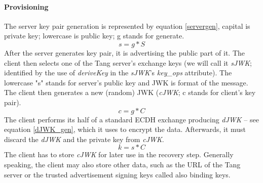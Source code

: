 \paragraph{Provisioning}
The server key pair generation is represented by equation \ref{servergen}, capital is private key; lowercase is public key; g stands for generate.
\begin{equation}\label{servergen}
    s = g * S
\end{equation}
After the server generates key pair, it is advertising the public part of it.
The client then selects one of the Tang server's exchange keys (we will call it {\it sJWK}; identified by the use of {\it deriveKey} in the {\it sJWK}'s {\it key\_ops} attribute).
The lowercase "s" stands for server's public key and JWK is format of the message.
The client then generates a new (random) JWK ({\it cJWK}; c stands for client's key pair).
\begin{equation}\label{clientgen}
    c = g * C
\end{equation}
The client performs its half of a standard ECDH exchange producing {\it dJWK} -- see equation \ref{dJWK_gen}, which it uses to encrypt the data.
Afterwards, it must discard the {\it dJWK} and the private key from {\it cJWK}.
\begin{equation}\label{dJWK_gen}
    k = s * C
\end{equation}
The client has to store {\it cJWK} for later use in the recovery step.
Generally speaking, the client may also store other data, such as the URL of the Tang server or the trusted advertisement signing keys called also binding keys.



